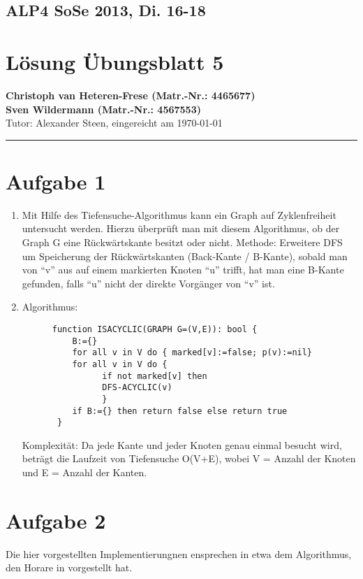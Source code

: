 \documentclass[11pt,a4paper,DIV=10,]{scrartcl}
\begin{document}
\subsection*{ALP4 SoSe 2013, Di. 16-18}
\section*{Lösung Übungsblatt 5}
\textbf{Christoph van Heteren-Frese (Matr.-Nr.: 4465677)} \\ \textbf{Sven Wildermann (Matr.-Nr.: 4567553)}\\
Tutor: Alexander Steen, eingereicht am \today\\
\hrule
\section*{Aufgabe 1}
\begin{enumerate}
 \item Mit Hilfe des Tiefensuche-Algorithmus kann ein Graph auf Zyklenfreiheit untersucht werden. Hierzu überprüft man mit diesem Algorithmus, ob der
 Graph G eine Rückwärtskante besitzt oder nicht. Methode: Erweitere DFS um Speicherung der Rückwärtskanten (Back-Kante / B-Kante), sobald man von ``v''
 aus auf einem markierten Knoten ``u'' trifft, hat man eine B-Kante gefunden, falls ``u'' nicht der direkte Vorgänger von ``v'' ist. 
 \item Algorithmus: 
 \begin{lstlisting}
      function ISACYCLIC(GRAPH G=(V,E)): bool {
          B:={}
          for all v in V do { marked[v]:=false; p(v):=nil}
          for all v in V do {
	      		if not marked[v] then
	      		DFS-ACYCLIC(v)
	     	 	}
          if B:={} then return false else return true
       }
 \end{lstlisting}
  Komplexität: Da jede Kante und jeder Knoten genau einmal besucht wird, beträgt die Laufzeit von Tiefensuche O(V+E), wobei V = Anzahl der Knoten und E = Anzahl der Kanten.  
\end{enumerate}
\section*{Aufgabe 2}
Die hier vorgestellten Implementierungnen ensprechen in etwa dem Algorithmus, den Horare in \cite{Hoare1974} vorgestellt hat.
\end{document}
